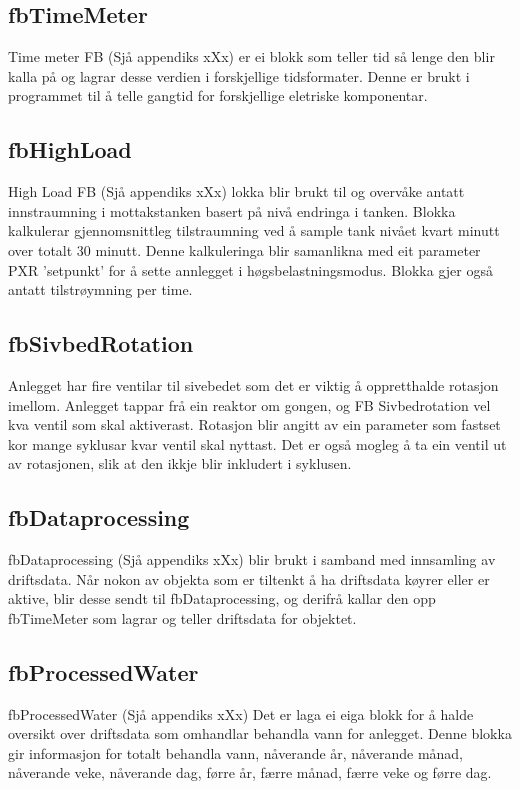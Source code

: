 \subsection{fbTimeMeter}
Time meter \gls{FB} (Sjå appendiks xXx) er ei blokk som teller tid så lenge den blir kalla på og lagrar desse verdien i forskjellige tidsformater.
Denne er brukt i programmet til å telle gangtid for forskjellige eletriske komponentar.

\subsection{fbHighLoad}
High Load \gls{FB} (Sjå appendiks xXx) lokka blir brukt til og overvåke antatt innstraumning i mottakstanken basert på nivå endringa i tanken. 
Blokka kalkulerar gjennomsnittleg tilstraumning ved å sample tank nivået kvart minutt over totalt 30 minutt.
Denne kalkuleringa blir samanlikna med eit parameter PXR 'setpunkt' for å sette annlegget i høgsbelastningsmodus.
Blokka gjer også antatt tilstrøymning per time.

\subsection{fbSivbedRotation}
Anlegget har fire ventilar til sivebedet som det er viktig å oppretthalde rotasjon imellom. Anlegget tappar frå ein reaktor om gongen, 
og \gls{FB} Sivbedrotation vel kva ventil som skal aktiverast.
Rotasjon blir angitt av ein parameter som fastset kor mange syklusar kvar ventil skal nyttast. 
Det er også mogleg å ta ein ventil ut av rotasjonen, slik at den ikkje blir inkludert i syklusen.

\subsection{fbDataprocessing}
fbDataprocessing (Sjå appendiks xXx) blir brukt i samband med innsamling av driftsdata. 
Når nokon av objekta som er tiltenkt å ha driftsdata køyrer eller er aktive, blir desse sendt til fbDataprocessing, og derifrå kallar den opp fbTimeMeter som lagrar og teller driftsdata for objektet.

\subsection{fbProcessedWater}
fbProcessedWater (Sjå appendiks xXx)
Det er laga ei eiga blokk for å halde oversikt over driftsdata som omhandlar behandla vann for anlegget. 
Denne blokka gir informasjon for totalt behandla vann, nåverande år, nåverande månad, nåverande veke, nåverande dag, førre år, færre månad, færre veke og førre dag.